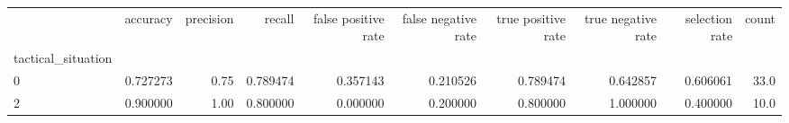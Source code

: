 \begin{tabular}{lrrrrrrrrr}
\toprule
{} &  accuracy &  precision &    recall &  false positive rate &  false negative rate &  true positive rate &  true negative rate &  selection rate &  count \\
tactical\_situation &           &            &           &                      &                      &                     &                     &                 &        \\
\midrule
0                  &  0.727273 &       0.75 &  0.789474 &             0.357143 &             0.210526 &            0.789474 &            0.642857 &        0.606061 &   33.0 \\
2                  &  0.900000 &       1.00 &  0.800000 &             0.000000 &             0.200000 &            0.800000 &            1.000000 &        0.400000 &   10.0 \\
\bottomrule
\end{tabular}
